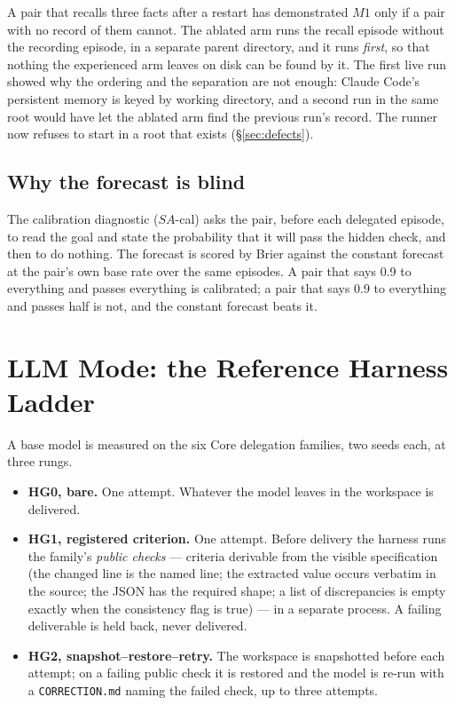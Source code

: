 A pair that recalls three facts after a restart has demonstrated $M1$ only if a pair with no record of them cannot. The ablated arm runs the recall episode without the recording episode, in a separate parent directory, and it runs \emph{first}, so that nothing the experienced arm leaves on disk can be found by it. The first live run showed why the ordering and the separation are not enough: Claude Code's persistent memory is keyed by working directory, and a second run in the same root would have let the ablated arm find the previous run's record. The runner now refuses to start in a root that exists (\S\ref{sec:defects}).

\subsection{Why the forecast is blind}

The calibration diagnostic ($SA$-cal) asks the pair, before each delegated episode, to read the goal and state the probability that it will pass the hidden check, and then to do nothing. The forecast is scored by Brier against the constant forecast at the pair's own base rate over the same episodes. A pair that says 0.9 to everything and passes everything is calibrated; a pair that says 0.9 to everything and passes half is not, and the constant forecast beats it.

\section{LLM Mode: the Reference Harness Ladder}\label{sec:llm}

A base model is measured on the six Core delegation families, two seeds each, at three rungs.

\begin{itemize}[leftmargin=*,itemsep=2pt]
\item \textbf{HG0, bare.} One attempt. Whatever the model leaves in the workspace is delivered.
\item \textbf{HG1, registered criterion.} One attempt. Before delivery the harness runs the family's \emph{public checks} --- criteria derivable from the visible specification (the changed line is the named line; the extracted value occurs verbatim in the source; the JSON has the required shape; a list of discrepancies is empty exactly when the consistency flag is true) --- in a separate process. A failing deliverable is held back, never delivered.
\item \textbf{HG2, snapshot--restore--retry.} The workspace is snapshotted before each attempt; on a failing public check it is restored and the model is re-run with a \texttt{CORRECTION.md} naming the failed check, up to three attempts.
\end{itemize}

